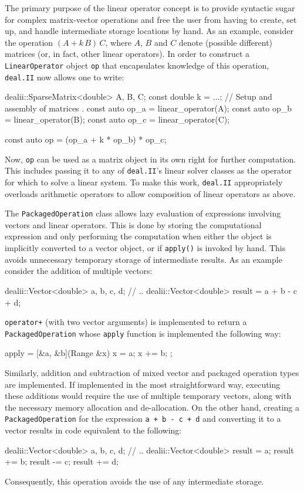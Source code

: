 \documentclass{ansarticle-preprint}
\newcommand{\specialword}[1]{\texttt{#1}}
\newcommand{\dealii}{{\specialword{deal.II}}}
\begin{document}
The primary purpose of the linear operator concept is to provide syntactic
sugar for complex matrix-vector operations and free the user from having to
create, set up, and handle intermediate storage locations by hand. As an
example, consider the operation $(A+k\,B)\,C$, where $A$, $B$ and $C$ denote
(possible different) matrices (or, in fact, other linear operators). In order
to construct a \verb|LinearOperator|
object \texttt{op} that encapsulates knowledge of this operation,
\dealii{} now allows one to write:

\begin{c++}
  dealii::SparseMatrix<double> A, B, C;
  const double k = ...;
  // Setup and assembly of matrices
  .
  const auto op_a = linear_operator(A);
  const auto op_b = linear_operator(B);
  const auto op_c = linear_operator(C);

  const auto op = (op_a + k * op_b) * op_c;
\end{c++}
Now, \texttt{op} can be used as a matrix object in its own right for
further computation. This includes passing it to any of \dealii{}'s linear
solver classes as the operator for which to solve a linear system. To make
this work, \dealii{} appropriately overloads arithmetic operators to allow
composition of linear operators as above.

The \texttt{PackagedOperation} class allows lazy evaluation of expressions
involving vectors and linear operators. This is done by storing the
computational expression and only performing the computation when either
the object is implicitly converted to a vector object, or if
\texttt{apply()} is invoked by hand. This avoids unnecessary temporary
storage of intermediate results. As an example consider the addition of
multiple vectors:
\begin{c++}
   dealii::Vector<double> a, b, c, d;
   // ..
   dealii::Vector<double> result = a + b - c + d;
\end{c++}

\texttt{operator+} (with two vector arguments) is implemented to return a
\texttt{PackagedOperation} whose \texttt{apply} function is implemented the
following way:
\begin{c++}
  apply = [&a, &b](Range &x) {
                                x = a;
                                x += b;
                             };
\end{c++}
Similarly, addition and subtraction of mixed vector and packaged operation
types are implemented. If implemented in the most straightforward way,
executing these additions would require the use of multiple temporary
vectors, along with the necessary memory allocation and de-allocation. On
the other hand, creating a \texttt{PackagedOperation} for the expression
\texttt{a + b - c + d} and converting it to a vector results in code
equivalent to the following:
\begin{c++}
   dealii::Vector<double> a, b, c, d;
   // ..
   dealii::Vector<double> result = a;
   result += b;
   result -= c;
   result += d;
\end{c++}
Consequently, this operation avoids the use of any intermediate storage.
\end{document}
